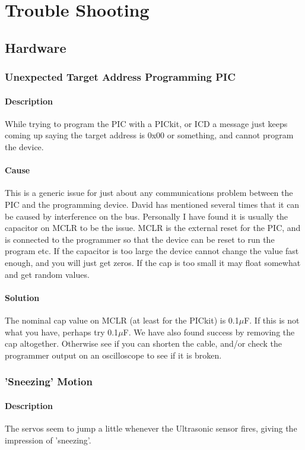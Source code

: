 \documentclass[]{report}
\begin{document}
\part{Trouble Shooting}
\chapter{Hardware}
\section{Unexpected Target Address Programming PIC}
\subsection{Description}
While trying to program the PIC with a PICkit, or ICD a message just keeps coming up saying the target address is 0x00 or something, and cannot program the device.

\subsection{Cause}
This is a generic issue for just about any communications problem between the PIC and the programming device. David has mentioned several times that it can be caused by interference on the bus. Personally I have found it is usually the capacitor on MCLR to be the issue. MCLR is the external reset for the PIC, and is connected to the programmer so that the device can be reset to run the program etc. If the capacitor is too large the device cannot change the value fast enough, and you will just get zeros. If the cap is too small it may float somewhat and get random values.

\subsection{Solution}
The nominal cap value on MCLR (at least for the PICkit) is 0.1$\mu$F. If this is not what you have, perhaps try 0.1$\mu$F. We have also found success by removing the cap altogether. Otherwise see if you can shorten the cable, and/or check the programmer output on an oscilloscope to see if it is broken.

\section{'Sneezing' Motion}
\subsection{Description}
The servos seem to jump a little whenever the Ultrasonic sensor fires, giving the impression of 'sneezing'.
\end{document}
